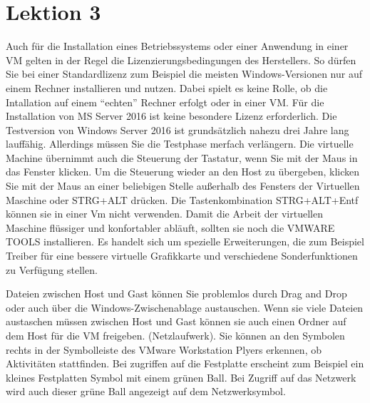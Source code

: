 \documentclass[a4paper,10pt]{article}
\begin{document}
\section{Lektion 3}
Auch für die Installation eines Betriebssystems oder einer Anwendung in einer VM gelten in der Regel die Lizenzierungsbedingungen des Herstellers. So dürfen Sie bei einer Standardlizenz zum Beispiel die meisten Windows-Versionen nur auf einem Rechner installieren und nutzen. Dabei spielt es keine Rolle, ob die Intallation auf einem ``echten'' Rechner erfolgt oder in einer VM. Für die Installation von MS Server 2016 ist keine besondere Lizenz erforderlich. Die Testversion von Windows Server 2016 ist grundsätzlich nahezu drei Jahre lang lauffähig. Allerdings müssen Sie die Testphase merfach verlängern.
\vspace{3mm}
Die virtuelle Machine übernimmt auch die Steuerung der Tastatur, wenn Sie mit der Maus in das Fenster klicken. Um die Steuerung wieder an den Host zu übergeben, klicken Sie mit der Maus an einer beliebigen Stelle außerhalb des Fensters der Virtuellen Maschine oder STRG+ALT drücken. Die Tastenkombination STRG+ALT+Entf können sie in einer Vm nicht verwenden.
\vspace{3mm}
Damit die Arbeit der virtuellen Maschine flüssiger und konfortabler abläuft, sollten sie noch die VMWARE TOOLS installieren. Es handelt sich um spezielle Erweiterungen, die zum Beispiel Treiber für eine bessere virtuelle Grafikkarte und verschiedene Sonderfunktionen zu Verfügung stellen.


Dateien zwischen Host und Gast können Sie problemlos durch Drag and Drop oder auch über die Windows-Zwischenablage austauschen. Wenn sie viele Dateien austaschen müssen zwischen Host und Gast können sie auch einen Ordner auf dem Host für die VM freigeben. (Netzlaufwerk). Sie können an den Symbolen rechts in der Symbolleiste des VMware Workstation Plyers erkennen, ob Aktivitäten stattfinden. Bei zugriffen auf die Festplatte erscheint zum Beispiel ein kleines Festplatten Symbol mit einem grünen Ball. Bei Zugriff auf das Netzwerk wird auch dieser grüne Ball angezeigt auf dem Netzwerksymbol.
\end{document}
